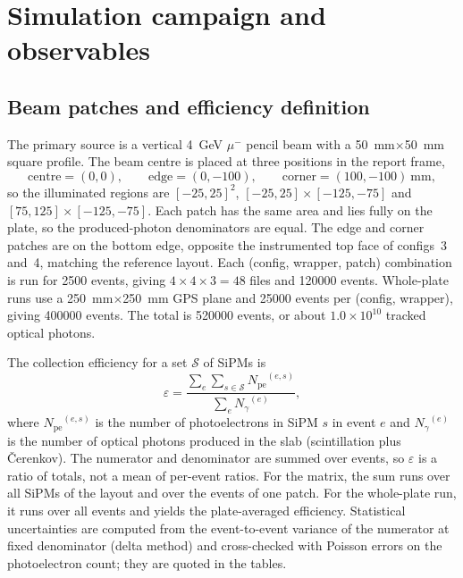 \documentclass[preprint,12pt]{elsarticle}
\newcommand{\pe}{\ensuremath{N_{\mathrm{pe}}}}
\newcommand{\ngam}{\ensuremath{N_{\gamma}}}
\newcommand{\eps}{\ensuremath{\varepsilon}}
\begin{document}
\section{Simulation campaign and observables}
\label{sec:method}

\subsection{Beam patches and efficiency definition}

The primary source is a vertical \SI{4}{\giga\electronvolt} $\mu^-$ pencil beam
with a \SI{50}{\milli\meter}$\times$\SI{50}{\milli\meter} square profile. The
beam centre is placed at three positions in the report frame,
\[
\text{centre}=(0,0),\qquad
\text{edge}=(0,-100),\qquad
\text{corner}=(100,-100)\ \si{\milli\meter},
\]
so the illuminated regions are $[-25,25]^2$,
$[-25,25]\times[-125,-75]$ and $[75,125]\times[-125,-75]$. Each patch has the
same area and lies fully on the plate, so the produced-photon denominators are
equal. The edge and corner patches are on the bottom edge, opposite the
instrumented top face of configs~3 and~4, matching the reference layout. Each
(config, wrapper, patch) combination is run for \num{2500} events, giving
$4\times4\times3=48$ files and \num{120000} events. Whole-plate runs use a
\SI{250}{\milli\meter}$\times$\SI{250}{\milli\meter} GPS plane and \num{25000}
events per (config, wrapper), giving \num{400000} events. The total is
\num{520000} events, or about $1.0\times10^{10}$ tracked optical photons.

The collection efficiency for a set $\mathcal{S}$ of SiPMs is
\begin{equation}
\eps=\frac{\sum_e\sum_{s\in\mathcal{S}}\pe^{(e,s)}}{\sum_e\ngam^{(e)}},
\label{eq:eff}
\end{equation}
where $\pe^{(e,s)}$ is the number of photoelectrons in SiPM $s$ in event $e$ and
$\ngam^{(e)}$ is the number of optical photons produced in the slab (scintillation
plus \v{C}erenkov). The numerator and denominator are summed over events, so
$\eps$ is a ratio of totals, not a mean of per-event ratios. For the matrix, the
sum runs over all SiPMs of the layout and over the events of one patch. For the
whole-plate run, it runs over all events and yields the plate-averaged
efficiency. Statistical uncertainties are computed from the event-to-event
variance of the numerator at fixed denominator (delta method) and cross-checked
with Poisson errors on the photoelectron count; they are quoted in the tables.
\end{document}
